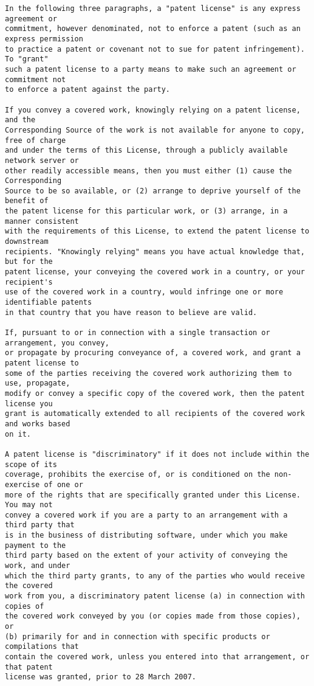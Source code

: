 \begin{verbatim}
In the following three paragraphs, a "patent license" is any express agreement or
commitment, however denominated, not to enforce a patent (such as an express permission
to practice a patent or covenant not to sue for patent infringement). To "grant"
such a patent license to a party means to make such an agreement or commitment not
to enforce a patent against the party.

If you convey a covered work, knowingly relying on a patent license, and the
Corresponding Source of the work is not available for anyone to copy, free of charge
and under the terms of this License, through a publicly available network server or
other readily accessible means, then you must either (1) cause the Corresponding
Source to be so available, or (2) arrange to deprive yourself of the benefit of
the patent license for this particular work, or (3) arrange, in a manner consistent
with the requirements of this License, to extend the patent license to downstream
recipients. "Knowingly relying" means you have actual knowledge that, but for the
patent license, your conveying the covered work in a country, or your recipient's
use of the covered work in a country, would infringe one or more identifiable patents
in that country that you have reason to believe are valid.

If, pursuant to or in connection with a single transaction or arrangement, you convey,
or propagate by procuring conveyance of, a covered work, and grant a patent license to
some of the parties receiving the covered work authorizing them to use, propagate,
modify or convey a specific copy of the covered work, then the patent license you
grant is automatically extended to all recipients of the covered work and works based
on it.

A patent license is "discriminatory" if it does not include within the scope of its
coverage, prohibits the exercise of, or is conditioned on the non-exercise of one or
more of the rights that are specifically granted under this License. You may not
convey a covered work if you are a party to an arrangement with a third party that
is in the business of distributing software, under which you make payment to the
third party based on the extent of your activity of conveying the work, and under
which the third party grants, to any of the parties who would receive the covered
work from you, a discriminatory patent license (a) in connection with copies of
the covered work conveyed by you (or copies made from those copies), or
(b) primarily for and in connection with specific products or compilations that
contain the covered work, unless you entered into that arrangement, or that patent
license was granted, prior to 28 March 2007.


\end{verbatim}
